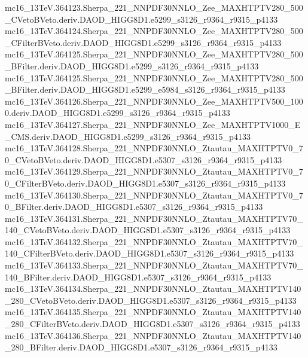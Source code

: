 \begin{scriptsize}
mc16\_13TeV.364123.Sherpa\_221\_NNPDF30NNLO\_Zee\_MAXHTPTV280\_500\_CVetoBVeto.deriv.DAOD\_HIGG8D1.e5299\_s3126\_r9364\_r9315\_p4133 \\
mc16\_13TeV.364124.Sherpa\_221\_NNPDF30NNLO\_Zee\_MAXHTPTV280\_500\_CFilterBVeto.deriv.DAOD\_HIGG8D1.e5299\_s3126\_r9364\_r9315\_p4133 \\
mc16\_13TeV.364125.Sherpa\_221\_NNPDF30NNLO\_Zee\_MAXHTPTV280\_500\_BFilter.deriv.DAOD\_HIGG8D1.e5299\_s3126\_r9364\_r9315\_p4133 \\
mc16\_13TeV.364125.Sherpa\_221\_NNPDF30NNLO\_Zee\_MAXHTPTV280\_500\_BFilter.deriv.DAOD\_HIGG8D1.e5299\_e5984\_s3126\_r9364\_r9315\_p4133 \\
mc16\_13TeV.364126.Sherpa\_221\_NNPDF30NNLO\_Zee\_MAXHTPTV500\_1000.deriv.DAOD\_HIGG8D1.e5299\_s3126\_r9364\_r9315\_p4133 \\
mc16\_13TeV.364127.Sherpa\_221\_NNPDF30NNLO\_Zee\_MAXHTPTV1000\_E\_CMS.deriv.DAOD\_HIGG8D1.e5299\_s3126\_r9364\_r9315\_p4133 \\
mc16\_13TeV.364128.Sherpa\_221\_NNPDF30NNLO\_Ztautau\_MAXHTPTV0\_70\_CVetoBVeto.deriv.DAOD\_HIGG8D1.e5307\_s3126\_r9364\_r9315\_p4133 \\
mc16\_13TeV.364129.Sherpa\_221\_NNPDF30NNLO\_Ztautau\_MAXHTPTV0\_70\_CFilterBVeto.deriv.DAOD\_HIGG8D1.e5307\_s3126\_r9364\_r9315\_p4133 \\
mc16\_13TeV.364130.Sherpa\_221\_NNPDF30NNLO\_Ztautau\_MAXHTPTV0\_70\_BFilter.deriv.DAOD\_HIGG8D1.e5307\_s3126\_r9364\_r9315\_p4133 \\
mc16\_13TeV.364131.Sherpa\_221\_NNPDF30NNLO\_Ztautau\_MAXHTPTV70\_140\_CVetoBVeto.deriv.DAOD\_HIGG8D1.e5307\_s3126\_r9364\_r9315\_p4133 \\
mc16\_13TeV.364132.Sherpa\_221\_NNPDF30NNLO\_Ztautau\_MAXHTPTV70\_140\_CFilterBVeto.deriv.DAOD\_HIGG8D1.e5307\_s3126\_r9364\_r9315\_p4133 \\
mc16\_13TeV.364133.Sherpa\_221\_NNPDF30NNLO\_Ztautau\_MAXHTPTV70\_140\_BFilter.deriv.DAOD\_HIGG8D1.e5307\_s3126\_r9364\_r9315\_p4133 \\
mc16\_13TeV.364134.Sherpa\_221\_NNPDF30NNLO\_Ztautau\_MAXHTPTV140\_280\_CVetoBVeto.deriv.DAOD\_HIGG8D1.e5307\_s3126\_r9364\_r9315\_p4133 \\
mc16\_13TeV.364135.Sherpa\_221\_NNPDF30NNLO\_Ztautau\_MAXHTPTV140\_280\_CFilterBVeto.deriv.DAOD\_HIGG8D1.e5307\_s3126\_r9364\_r9315\_p4133 \\
mc16\_13TeV.364136.Sherpa\_221\_NNPDF30NNLO\_Ztautau\_MAXHTPTV140\_280\_BFilter.deriv.DAOD\_HIGG8D1.e5307\_s3126\_r9364\_r9315\_p4133 \\

\end{scriptsize}

